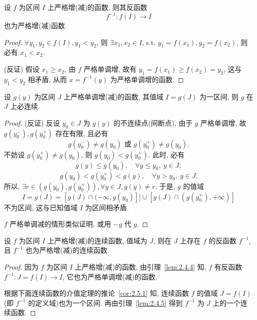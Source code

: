 \begin{lemma}\label{lem:2.4.4}
设 $f$ 为区间 $I$ 上严格增(减)的函数, 则其反函数
\[
f^{-1}: f(I) \to I
\]
也为严格增(减)函数.
\end{lemma}

\begin{proof}
$\forall y_1, y_2 \in f(I), y_1 < y_2$, 则 $\exists x_1, x_2 \in I$, s.t. $y_1 = f(x_1), y_2 = f(x_2)$, 则必有 $x_1 < x_2$.

(反证) 假设 $x_1 \geqslant x_2$, 由 $f$ 严格单调增, 故有 $y_1 = f(x_1) \geqslant f(x_2) = y_2$, 这与 $y_1 < y_2$ 相矛盾, 从而 $x = f^{-1}(y)$ 为严格单调增的函数.
\end{proof}

\begin{lemma}\label{lem:2.4.5}
设 $g(y)$ 为区间 $J$ 上严格单调增(减)的函数, 其值域 $I = g(J)$ 为一区间, 则 $g$ 在 $J$ 上必连续.
\end{lemma}

\begin{proof}
(反证) 反设 $y_0 \in J$ 为 $g(y)$ 的不连续点(间断点), 由于 $g$ 严格单调增, 故 $g(y_0^-), g(y_0^+)$ 存在有限, 且必有
\[
g(y_0^-) \neq g(y_0) \text{ 或 } g(y_0^+) \neq g(y_0).
\]
不妨设 $g(y_0^+) \neq g(y_0)$, 则 $g(y_0) < g(y_0^+)$. 此时, 必有
\[
g(y) \leqslant g(y_0),\quad \forall y \leqslant y_0,\ y \in J;
\]
\[
g(y_0) < g(y_0^+) < g(y),\quad \forall y > y_0,\ y \in J.
\]
所以, $\exists r \in (g(y_0), g(y_0^+)), \forall y \in J, g(y) \neq r$. 于是, $g$ 的值域
\[
I = g(J) = [g(J) \cap (-\infty, g(y_0)]] \cup [g(J) \cap (g(y_0^+), +\infty)]
\]
不为区间, 这与已知值域 $I$ 为区间相矛盾.

$f$ 严格单调减的情形类似证明, 或用 $-g$ 代 $g$.
\end{proof}

\begin{theorem}\label{thm:2.4.4}
设 $f$ 为区间 $I$ 上严格增(减)的连续函数, 值域为 $J$, 则在 $J$ 上存在 $f$ 的反函数 $f^{-1}$, 且 $f^{-1}$ 也为严格增(减)的连续函数.
\end{theorem}

\begin{proof}
因为 $f$ 为区间 $I$ 上严格增(减)的函数, 由引理~\ref{lem:2.4.4} 知, $f$ 有反函数 $f^{-1}: J = f(I) \to I$, 它也为严格单调增(减)的函数.

根据下面连续函数的介值定理的推论~\ref{cor:2.5.1} 知, 连续函数 $f$ 的值域 $J = f(I)$(即 $f^{-1}$ 的定义域)也为一个区间. 再由引理~\ref{lem:2.4.5} 得到 $f^{-1}$ 为 $J$ 上的一个连续函数.
\end{proof}

